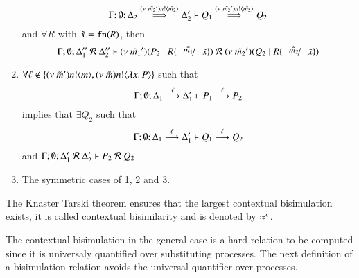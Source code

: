 \begin{definition}
\begin{enumerate}
\[				\horel{\Gamma}{\Delta_2}{Q_1}{\By{\news{\tilde{m_2}'} \bactout{n}{\tilde{m_2}}}}{\Delta_2'}{Q_2}
			\]
			and $\forall R$ with $\tilde{x} = \fn{R}$, %
			then
			\[
				\horel{\Gamma}{\Delta_1''}{\newsp{\tilde{m_1}'}{P_2 \Par R \subst{\tilde{m_1}}{\tilde{x}}}}{\ \mathcal{R}\ }{\Delta_2''}{\newsp{\tilde{m_2}'}{Q_2 \Par R \subst{\tilde{m_2}}{\tilde{x}}}}
			\]

		\item	$\forall \ell \notin \set{\news{\tilde{m}'} \bactout{n}{m}, \news{\tilde{m}} \bactout{n}{\abs{x}{P}}}$ such that
			\[
				\horel{\Gamma}{\Delta_1}{P_1}{\by{\ell}}{\Delta_1'}{P_2}
			\]
			implies that $\exists Q_2$ such that 
			\[
				\horel{\Gamma}{\Delta_1}{Q_1}{\by{\ell}}{\Delta_1'}{Q_2}
			\]
			and
			$\horel{\Gamma}{\Delta_1'}{P_2}{\ \mathcal{R}\ }{\Delta_2'}{Q_2}$

		\item	The symmetric cases of 1, 2 and 3.
	\end{enumerate}
	The Knaster Tarski theorem ensures that the largest contextual bisimulation exists, it is called contextual bisimilarity and is denoted by $\wb^c$.
\end{definition}

The contextual bisimulation in the general case is a hard relation to be computed
since it is universaly quantified over substituting processes. The next definition
of a bisimulation relation avoids the universal quantifier over processes.


